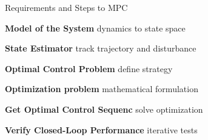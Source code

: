 
\begin{sstTitleBox}[BrickRed]{
		Requirements and Steps to MPC
	}
	\begin{centering}
		\begin{sstOnlyFrame}[BrickRed]
			\small
			\textbf{Model of the System}
			dynamics to state space

			\textbf{State Estimator}
			track trajectory and disturbance

			\textbf{Optimal Control Problem}
			define strategy

			\textbf{Optimization problem}
			mathematical formulation

			\textbf{Get Optimal Control Sequenc}
			solve optimization

			\textbf{Verify Closed-Loop Performance}
			iterative tests
		\end{sstOnlyFrame}
	\end{centering}
\end{sstTitleBox}
